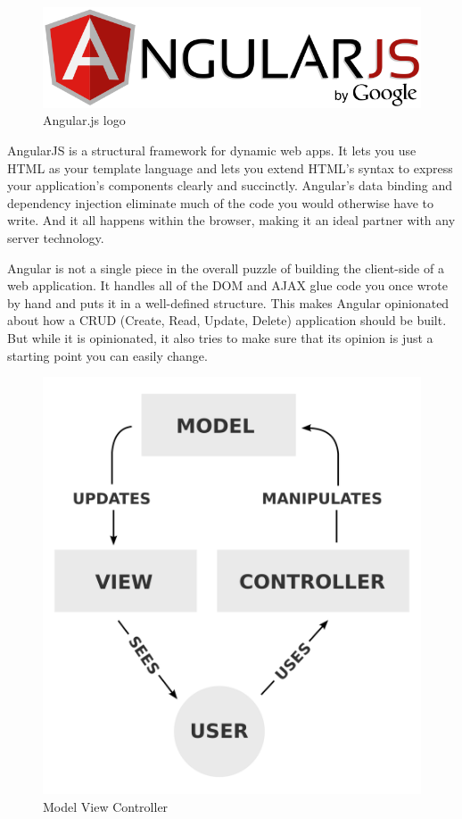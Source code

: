 \begin{figure}[h]
\centering \includegraphics[scale=0.3]{images/Angular.png}
\caption{Angular.js logo}
\end{figure}
\noindent AngularJS is a structural framework for dynamic web apps. It lets you use HTML as your template language and lets you extend HTML's syntax to express your application's components clearly and succinctly. Angular's data binding and dependency injection eliminate much of the code you would otherwise have to write. And it all happens within the browser, making it an ideal partner with any server technology.

Angular is not a single piece in the overall puzzle of building the client-side of a web application. It handles all of the DOM and AJAX glue code you once wrote by hand and puts it in a well-defined structure. This makes Angular opinionated about how a CRUD (Create, Read, Update, Delete) application should be built. But while it is opinionated, it also tries to make sure that its opinion is just a starting point you can easily change.

\begin{figure}[h]
\centering \includegraphics[scale=0.1]{images/mvc.png}
\caption{Model View Controller}
\end{figure}


